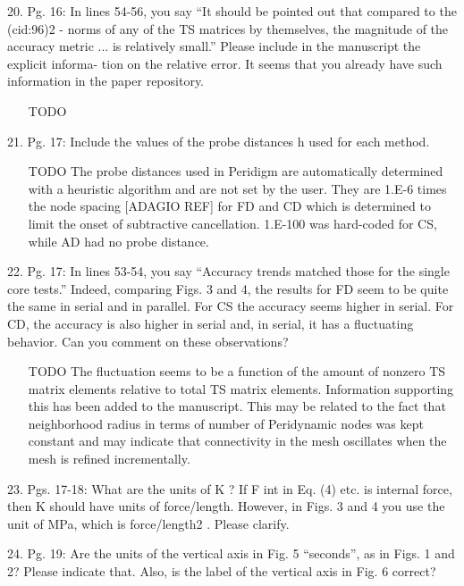 \documentclass{article}
\begin{document}
\begin{enumerate}
20. Pg. 16: In lines 54-56, you say “It should be pointed out that compared to the (cid:96)2 -
norms of any of the TS matrices by themselves, the magnitude of the accuracy
metric ... is relatively small.” Please include in the manuscript the explicit informa-
tion on the relative error. It seems that you already have such information in the
paper repository.
{\color{red}  
\begin{itemize}
     \item
[TODO]
  \end{itemize}}

21. Pg. 17: Include the values of the probe distances h used for each method.
{\color{red}  
\begin{itemize}
     \item
[TODO]
     The probe distances used in Peridigm are automatically determined with a heuristic algorithm and are not set by the user. They are 1.E-6 times the node spacing [ADAGIO REF] for FD and CD which is determined to limit the onset of subtractive cancellation. 1.E-100 was hard-coded for CS, while AD had no probe distance.
  \end{itemize}}

22. Pg. 17: In lines 53-54, you say “Accuracy trends matched those for the single core
tests.” Indeed, comparing Figs. 3 and 4, the results for FD seem to be quite the
same in serial and in parallel. For CS the accuracy seems higher in serial. For CD,
the accuracy is also higher in serial and, in serial, it has a ﬂuctuating behavior. Can
you comment on these observations?
{\color{red}  
\begin{itemize}
     \item
[TODO]
	The fluctuation seems to be a function of the amount of nonzero TS matrix elements relative to total TS matrix elements. Information supporting this has been added to the manuscript. This may be related to the fact that neighborhood radius in terms of number of Peridynamic nodes was kept constant and may indicate that connectivity in the mesh oscillates when the mesh is refined incrementally. 
  \end{itemize}}

23. Pgs. 17-18: What are the units of K ? If F int in Eq. (4) etc. is internal force, then K
should have units of force/length. However, in Figs. 3 and 4 you use the unit of
MPa, which is force/length2 . Please clarify.

24. Pg. 19: Are the units of the vertical axis in Fig. 5 “seconds”, as in Figs. 1 and 2?
Please indicate that. Also, is the label of the vertical axis in Fig. 6 correct?


\end{enumerate}
\end{document}

